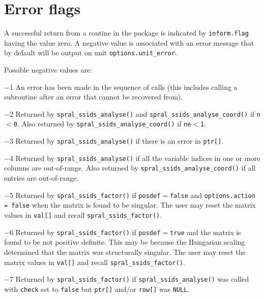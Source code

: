 
\section{Error flags} \label{ssids: errors}

A successful return from a routine in the package is indicated by
{\tt inform.flag} having the value zero.
A negative value is associated with an error message that by default will
be output on unit {\tt options.unit\_error}.

Possible negative values are:

\begin{description}
\item{$-$1} An error has been made in the sequence of calls (this includes
            calling a subroutine after an error that cannot be recovered from).
\item{$-$2} Returned by {\tt spral\_ssids\_analyse()} and {\tt spral\_ssids\_analyse\_coord()}
            if {\tt n$<$0}. Also returned by {\tt spral\_ssids\_analyse\_coord()} if
            {\tt ne$<$1}.
\item{$-$3} Returned by {\tt spral\_ssids\_analyse()} if there is an error in
            {\tt ptr[]}.
\item{$-$4} Returned by {\tt spral\_ssids\_analyse()} if all the variable indices in
            one or more columns  are out-of-range. Also returned by
            {\tt spral\_ssids\_analyse\_coord()} if all entries are out-of-range.
\item{$-$5} Returned by {\tt spral\_ssids\_factor()} if
            {\tt posdef}$=${\tt false} and
            {\tt options.action = false} when the matrix is found to be
            singular. The user may reset the matrix values in {\tt val[]}
            and recall {\tt spral\_ssids\_factor()}.
\item{$-$6} Returned by {\tt spral\_ssids\_factor()} if
            {\tt posdef}$=${\tt true} and the matrix is found to
            be not positive definite. This may be because the Hungarian scaling
            determined that the matrix was structurally singular. The user may
            reset the matrix values in {\tt val[]} and recall
            {\tt spral\_ssids\_factor()}.
\item{$-$7} Returned by {\tt spral\_ssids\_factor()} if {\tt spral\_ssids\_analyse()} was
            called with {\tt check} set to {\tt false} but {\tt ptr[]}
            and/or {\tt row[]} was \texttt{NULL}.

\end{description}
